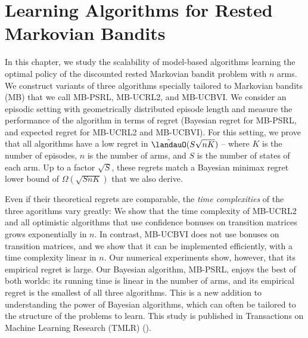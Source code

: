 \begingroup

\let\clearpage\relax

\chapter{Learning Algorithms for Rested Markovian Bandits}
\label{ch:learning_rested}

In this chapter, we study the scalability of model-based algorithms learning the optimal policy of the discounted rested Markovian bandit problem with $n$ arms. %
We construct variants of three algorithms specially tailored to Markovian bandits (MB) that we call MB-PSRL, MB-UCRL2, and MB-UCBVI. We consider an episodic setting with geometrically distributed episode length and measure the performance of the algorithm in terms of regret (Bayesian regret for MB-PSRL, and expected regret for MB-UCRL2 and MB-UCBVI). For this setting, we prove that all algorithms have a low regret in $\tilde{\landauO}(S\sqrt{nK})$ -- where $K$ is the number of episodes, $n$ is the number of arms, and $S$ is the number of states of each arm. Up to a factor $\sqrt{S}$, these regrets match a Bayesian minimax regret lower bound of $\Omega(\sqrt{SnK})$ that we also derive.

Even if their theoretical regrets are comparable, the \emph{time complexities} of the three agorithms vary greatly: We show that the {time} complexity of MB-UCRL2 and all optimistic algorithms that use confidence bonuses on transition matrices grows exponentially in $n$. In contrast, MB-UCBVI does not use bonuses on transition matrices, and we show that it can be implemented efficiently, with a time complexity linear in $n$. Our numerical experiments show, however, that its empirical regret is large. Our Bayesian algorithm, MB-PSRL, enjoys the best of both worlds: its running time is linear in the number of arms, and its empirical regret is the smallest of all three algorithms.
This is a new addition to understanding the power of Bayesian algorithms, which can often be tailored to the structure of the problems to learn.
This study is published in Transactions on Machine Learning Research (TMLR) (\cite{gast2022learning}).

